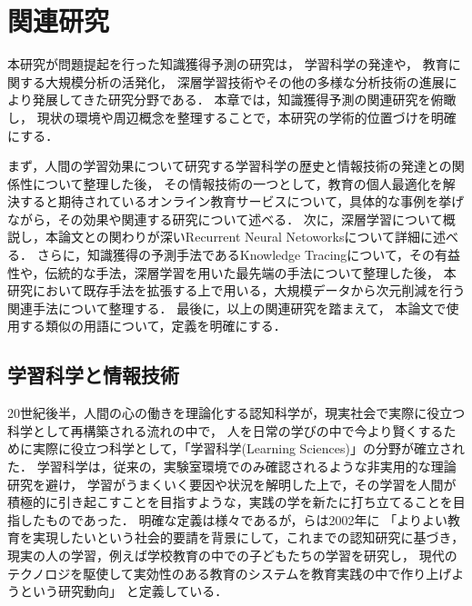 \chapter{関連研究}
\label{chap:previous}
\fancyhf{}
\rhead{\thepage}
\cfoot{\thepage}


本研究が問題提起を行った知識獲得予測の研究は，
学習科学の発達や，
教育に関する大規模分析の活発化，
深層学習技術やその他の多様な分析技術の進展により発展してきた研究分野である．
本章では，知識獲得予測の関連研究を俯瞰し，
現状の環境や周辺概念を整理することで，本研究の学術的位置づけを明確にする．


まず，人間の学習効果について研究する学習科学の歴史と情報技術の発達との関係性について整理した後，
その情報技術の一つとして，教育の個人最適化を解決すると期待されているオンライン教育サービスについて，具体的な事例を挙げながら，その効果や関連する研究について述べる．
次に，深層学習について概説し，本論文との関わりが深いRecurrent Neural Netoworksについて詳細に述べる．
さらに，知識獲得の予測手法であるKnowledge Tracingについて，その有益性や，伝統的な手法，深層学習を用いた最先端の手法について整理した後，
本研究において既存手法を拡張する上で用いる，大規模データから次元削減を行う関連手法について整理する．
最後に，以上の関連研究を踏まえて，
本論文で使用する類似の用語について，定義を明確にする．


\section{学習科学と情報技術}

20世紀後半，人間の心の働きを理論化する認知科学が，現実社会で実際に役立つ科学として再構築される流れの中で，
人を日常の学びの中で今より賢くするために実際に役立つ科学として，「学習科学(Learning Sciences)」の分野が確立された\cite{白水始2014学習科学の新展開}．
学習科学は，従来の，実験室環境でのみ確認されるような非実用的な理論研究を避け，
学習がうまくいく要因や状況を解明した上で，その学習を人間が積極的に引き起こすことを目指すような，実践の学を新たに打ち立てることを目指したものであった．
明確な定義は様々であるが，\cite{三宅なほみ2002学習環境のデザイン実験}らは2002年に
「よりよい教育を実現したいという社会的要請を背景にして，これまでの認知研究に基づき，
現実の人の学習，例えば学校教育の中での子どもたちの学習を研究し，
現代のテクノロジを駆使して実効性のある教育のシステムを教育実践の中で作り上げようという研究動向」
と定義している．


